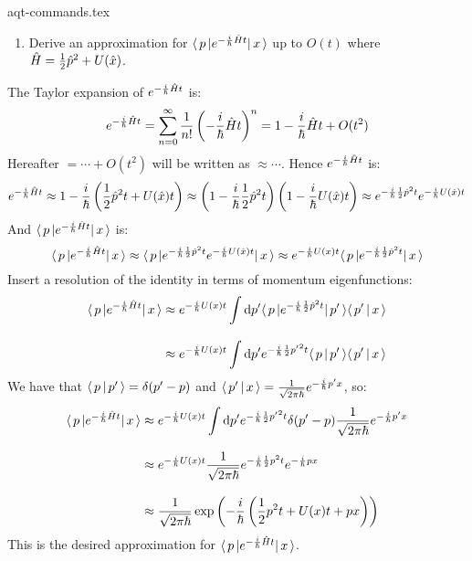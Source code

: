 {aqt-commands.tex}
\newcommand{\pp}{{p^\prime}}

\begin{enumerate}
  \item Derive an approximation for $\langle\,p\,\rvert e^{-\frac{i}{\hbar} \hat{H} t} \lvert\,x\,\rangle$
        up to $O(t)$ where $\hat{H} = \frac{1}{2} \hat{p}^2 + U(\hat{x})$.
\end{enumerate}

The Taylor expansion of $e^{-\frac{i}{\hbar} \hat{H} t}$ is:
\begin{equation*}
  e^{-\frac{i}{\hbar} \hat{H}t}
  = \sum_{n=0}^{\infty} \frac{1}{n!} \left( -\frac{i}{\hbar} \hat{H} t \right)^n
  = 1 - \frac{i}{\hbar}\hat{H}t + O(t^2)
\end{equation*}
Hereafter $=\cdots + O(t^2)$ will be written as $\approx\cdots$.
Hence $e^{-\frac{i}{\hbar} \hat{H}t}$ is:
\begin{equation*}
  e^{-\frac{i}{\hbar} \hat{H}t}
  \approx 1 - \frac{i}{\hbar} \left( \frac{1}{2} \hat{p}^2 t + U(\hat{x}) t \right)
  \approx \left(1 - \frac{i}{\hbar} \frac{1}{2} \hat{p}^2 t \right)\left(1 - \frac{i}{\hbar} U(\hat{x}) t\right)
  \approx e^{-\frac{i}{\hbar} \frac{1}{2} \hat{p}^2 t}e^{-\frac{i}{\hbar} U(\hat{x}) t}
\end{equation*}
And $\langle\,p\,\rvert e^{-\frac{i}{\hbar} \hat{H}t}\lvert\,x\,\rangle$ is:
\begin{equation*}
  \langle\,p\,\rvert e^{-\frac{i}{\hbar} \hat{H}t}\lvert\,x\,\rangle
  \approx \langle\,p\,\rvert e^{-\frac{i}{\hbar} \frac{1}{2} \hat{p}^2 t} e^{-\frac{i}{\hbar} U(\hat{x}) t} \lvert\,x\,\rangle
  \approx e^{-\frac{i}{\hbar} U(x) t} \langle\,p\,\rvert e^{-\frac{i}{\hbar} \frac{1}{2} \hat{p}^2 t} \lvert\,x\,\rangle
\end{equation*}
Insert a resolution of the identity in terms of momentum eigenfunctions:
\begin{align*}
  \bra{p}e^{-\ihbar \hat{H}t}\ket{x}
   & \approx e^{-\ihbar U(x) t}\int\d[\pp] \bra{p} e^{-\ihbar \half \hat{p}^2 t} \ket{\pp} \braket{\pp}{x}
  \\[2ex]
   & \approx e^{-\ihbar U(x) t}\int\d[\pp] e^{-\ihbar \half \pp^2 t} \braket{p}{\pp} \braket{\pp}{x}
\end{align*}
We have that $\braket{p}{\pp} = \delta(\pp-p)$ and $\braket{\pp}{x} = \frac{1}{\sqrt{2 \pi \hbar}}e^{-\ihbar \pp x}$, so:
\begin{align*}
  \bra{p}e^{-\ihbar \hat{H}t}\ket{x}
   & \approx e^{-\ihbar U(x) t}\int\d[\pp] e^{-\ihbar \half \pp^2 t} \delta(\pp-p) \frac{1}{\sqrt{2 \pi \hbar}}e^{-\ihbar \pp x}
  \\[2ex]
   & \approx e^{-\ihbar U(x) t} \frac{1}{\sqrt{2 \pi \hbar}} e^{-\ihbar \half p^2 t} e^{-\ihbar p x}
  \\[2ex]
   & \approx \frac{1}{\sqrt{2 \pi \hbar}} \exp\left( -\ihbar \left( \half p^2 t + U(x) t + p x \right) \right)
\end{align*}
This is the desired approximation for $\langle\,p\,\rvert e^{-\frac{i}{\hbar} \hat{H}t}\lvert\,x\,\rangle$.
